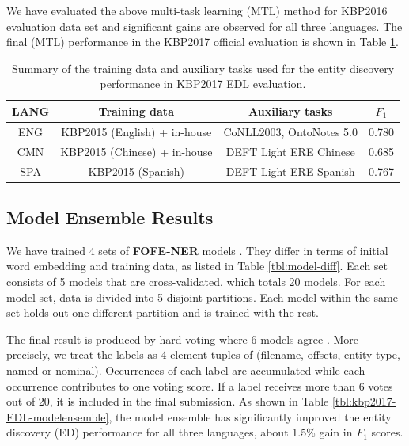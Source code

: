 \documentclass[11pt]{article}
\begin{document}
We have evaluated the above multi-task learning (MTL) method for KBP2016 evaluation data set and significant gains are observed for all three languages. The final (MTL) performance in the KBP2017 official evaluation is shown in Table \ref{tbl:summary-kbp2017-EDL4}.

\begin{table}
	\centering
	\begin{tabular}{|c|c|c|c|}
		\hline
		LANG  &  Training data   &  Auxiliary tasks  &  $F_1$ \\ \hline \hline
			ENG &   KBP2015 (English) + in-house & CoNLL2003, OntoNotes 5.0 & 0.780 \\
			CMN  &  KBP2015 (Chinese) + in-house  & DEFT Light ERE Chinese & 0.685 \\	
			SPA &  KBP2015 (Spanish) & DEFT Light ERE Spanish & 0.767 \\
      \hline
	\end{tabular}
	\caption{Summary of the training data and auxiliary tasks used for the entity discovery performance in KBP2017 EDL evaluation. }
	\label{tbl:summary-kbp2017-EDL4}	
\end{table}


\subsection{Model Ensemble Results}

We have trained 4 sets of \textbf{FOFE-NER} models \cite{xu2017local,xu2016fofe,xu2016yorknrm}.
They differ in terms of initial word embedding and training data, as listed in Table \ref{tbl:model-diff}. 
Each set consists of 5 models that are cross-validated, which totals 20 models. For each model set, data is divided into 5 disjoint partitions. Each model within the same set holds out one different partition and is trained with the rest. 

The final result is produced by hard voting where 6 models agree \cite{breiman1996bagging}. 
More precisely, we treat the labels as 4-element tuples of (filename, offsets, entity-type, named-or-nominal).
Occurrences of each label are accumulated while each occurrence contributes to one voting score. If a label receives more than 6 votes out of 20, it is included in the final submission. As shown in Table \ref{tbl:kbp2017-EDL-modelensemble}, the model ensemble has significantly improved the entity discovery (ED) performance for all three languages, about 1.5\% gain in $F_1$ scores. 
\end{document}
